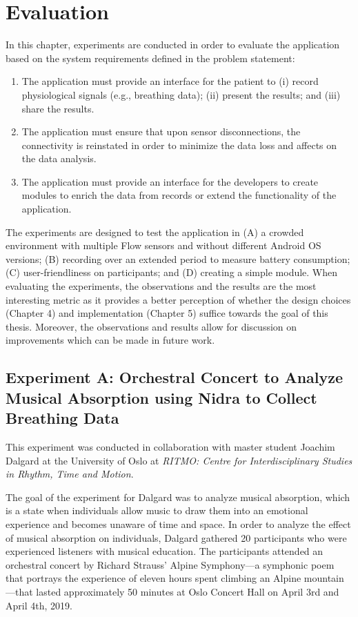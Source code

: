 \chapter{Evaluation}

In this chapter, experiments are conducted in order to evaluate the application based on the system requirements defined in the problem statement: 

\begin{enumerate}
    \item The application must provide an interface for the patient to (i) record physiological signals (e.g., breathing data); (ii) present the results; and (iii) share the results.
    \item The application must ensure that upon sensor disconnections, the connectivity is reinstated in order to minimize the data loss and affects on the data analysis. 
    \item The application must provide an interface for the developers to create modules to enrich the data from records or extend the functionality of the application.
\end{enumerate}

The experiments are designed to test the application in (A) a crowded environment with multiple Flow sensors and without different Android OS versions; (B) recording over an extended period to measure battery consumption; (C) user-friendliness on participants; and (D) creating a simple module. When evaluating the experiments, the observations and the results are the most interesting metric as it provides a better perception of whether the design choices (Chapter 4) and implementation (Chapter 5) suffice towards the goal of this thesis. Moreover, the observations and results allow for discussion on improvements which can be made in future work.  

\newpage
\section{Experiment A: Orchestral Concert to Analyze Musical Absorption using Nidra to Collect Breathing Data}
This experiment was conducted in collaboration with master student Joachim Dalgard at the University of Oslo at \textit{RITMO: Centre for Interdisciplinary Studies in Rhythm, Time and Motion}. 

The goal of the experiment for Dalgard was to analyze musical absorption, which is a state when individuals allow music to draw them into an emotional experience and becomes unaware of time and space. In order to analyze the effect of musical absorption on individuals, Dalgard gathered 20 participants who were experienced listeners with musical education. The participants attended an orchestral concert by Richard Strauss' Alpine Symphony---a symphonic poem that portrays the experience of eleven hours spent climbing an Alpine mountain---that lasted approximately 50 minutes at Oslo Concert Hall on April 3rd and April 4th, 2019.  

